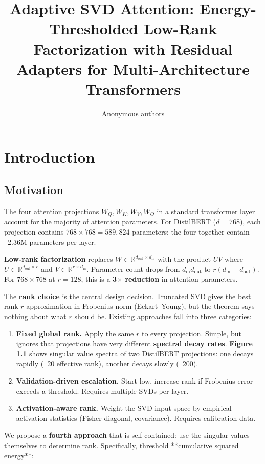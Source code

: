 \title{Adaptive SVD Attention: Energy-Thresholded Low-Rank Factorization with Residual Adapters for Multi-Architecture Transformers}

\author{Anonymous authors}



\section{Introduction}

\subsection{Motivation}

The four attention projections $W_Q, W_K, W_V, W_O$ in a standard transformer 
layer account for the majority of attention parameters. For DistilBERT 
($d = 768$), each projection contains $768 \times 768 = 589{,}824$ parameters; 
the four together contain ~2.36M parameters per layer.

\textbf{Low-rank factorization} replaces $W \in \mathbb{R}^{d_\text{out} \times d_\text{in}}$ 
with the product $U V$ where $U \in \mathbb{R}^{d_\text{out} \times r}$ and 
$V \in \mathbb{R}^{r \times d_\text{in}}$. Parameter count drops from 
$d_\text{in} d_\text{out}$ to $r (d_\text{in} + d_\text{out})$. For 
$768 \times 768$ at $r = 128$, this is a \textbf{3$\times$ reduction} in attention 
parameters.

The \textbf{rank choice} is the central design decision. Truncated SVD gives the 
best rank-$r$ approximation in Frobenius norm (Eckart--Young), but the theorem 
says nothing about what $r$ should be. Existing approaches fall into three 
categories:

\begin{enumerate}
\item \textbf{Fixed global rank.} Apply the same $r$ to every projection. Simple, but
  ignores that projections have very different \textbf{spectral decay rates}.
  \textbf{Figure 1.1} shows singular value spectra of two DistilBERT projections:
  one decays rapidly (~20 effective rank), another decays slowly (~200).

\item \textbf{Validation-driven escalation.} Start low, increase rank if Frobenius
  error exceeds a threshold. Requires multiple SVDs per layer.

\item \textbf{Activation-aware rank.} Weight the SVD input space by empirical
  activation statistics (Fisher diagonal, covariance). Requires calibration
  data.

\end{enumerate}
We propose a \textbf{fourth approach} that is self-contained: use the singular 
values themselves to determine rank. Specifically, threshold **cumulative 
squared energy**:

